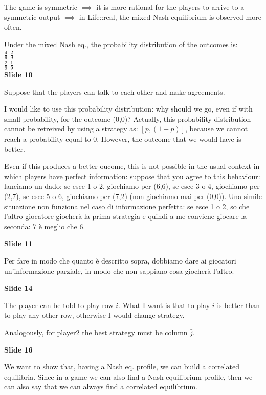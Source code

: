 \noindent The game is symmetric $\implies$ it is more rational for the 
players to arrive to a symmetric output $\implies$ in Life::real, the mixed 
Nash equilibrium is observed more often.

\noindent Under the mixed Nash eq., the probability distribution of the 
outcomes is:\\
$\frac{4}{9}$	$\frac{2}{9}$\\
$\frac{2}{9}$	$\frac{1}{9}$\\

\bigskip
\noindent \textbf{Slide 10}

\noindent Suppose that the players can talk to each other and make agreements.

\noindent I would like to use this probability distribution: why should we 
go, even if with small probability, for the outcome (0,0)? Actually, this 
probability distribution cannot be retreived by using a strategy as: 
$[p,(1-p)]$, because we cannot reach a probability equal to 0. However, the 
outcome that we would have is better.

\noindent Even if this produces a better oucome, this is not possible in 
the usual context in which players have perfect information: suppose that you 
agree to this behaviour: lanciamo un dado; se esce 1 o 2, giochiamo per (6,6), 
se esce 3 o 4, giochiamo per (2,7), se esce 5 o 6, giochiamo per (7,2) (non 
giochiamo mai per (0,0)). Una simile situazione non funziona nel caso di 
informazione perfetta: se esce 1 o 2, so che l'altro giocatore giocherà la 
prima strategia e quindi a me conviene giocare la seconda: 7 è meglio che 6.

\bigskip
\noindent \textbf{Slide 11}

\noindent Per fare in modo che quanto è descritto sopra, dobbiamo dare ai 
giocatori un'informazione parziale, in modo che non sappiano cosa giocherà 
l'altro.

\bigskip
\noindent \textbf{Slide 14}

\noindent The player can be told to play row $\bar{i}$. What I want is that 
to play $\bar{i}$ is better than to play any other row, otherwise I would 
change strategy.

\noindent Analogously, for player2 the best strategy must be column $\bar{j}$.

\bigskip
\noindent \textbf{Slide 16}

\noindent We want to show that, having a Nash eq. profile, we can build a 
correlated equilibria. Since in a game we can also find a Nash equilibrium 
profile, then we can also say that we can always find a correlated equilibrium. 

